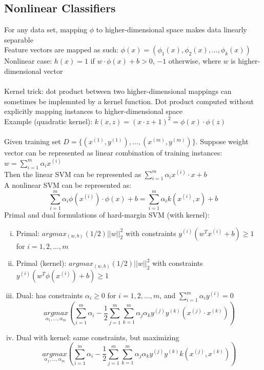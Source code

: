 \documentclass{article}
\begin{document}
		\subsection{Nonlinear Classifiers}
			For any data set, mapping $\phi$ to higher-dimensional space makes data linearly separable \\
			Feature vectors are mapped as such: $\phi(x) = (\phi_1(x), \phi_2(x), ..., \phi_k(x))$ \\
			Nonlinear case: $h(x) = 1$ if $w\cdot\phi(x) + b > 0$, $-1$ otherwise, where $w$ is higher-dimensional vector \\
			\\
			Kernel trick: dot product between two higher-dimensional mappings can sometimes be implemnted by a kernel function. Dot product computed without explicitly mapping instances to higher-dimensional space \\
			Example (quadratic kernel): $k(x, z) = (x \cdot z + 1)^2 = \phi(x)\cdot\phi(z)$ \\
			\\
			Given training set $D = \{(x^{(1)}, y^{(1)}), ..., (x^{(m)}, y^{(m)})\}$. Suppose weight vector can be represented as linear combination of training instances: $w = \sum_{i = 1}^m \alpha_ix^{(i)}$ \\
			Then the linear SVM can be represented as $\sum_{i = 1}^m \alpha_ix^{(i)} \cdot x + b$ \\
			A nonlinear SVM can be represented as:
			\begin{equation*}
				\sum\limits_{i = 1}^m \alpha_i\phi(x^{(i)})\cdot\phi(x) + b = \sum\limits_{i = 1}^m \alpha_i k(x^{(i)}, x) + b
				\end{equation*}
			Primal and dual formulations of hard-margin SVM (with kernel):
			\begin{enumerate}[(i)]
				\item Primal: $argmax_{(w, b)} (1/2)||w||_2^2$ with constraints $y^{(i)}(w^Tx^{(i)} + b) \geq 1$ for $i = 1, 2, ..., m$
				\item Primal (kernel): $argmax_{(w, b)} (1/2)||w||_2^2$ with constraints $y^{(i)}(w^T\phi(x^{(i)}) + b) \geq 1$
				\item Dual: has constraints $\alpha_i \geq 0$ for $i = 1, 2, ..., m$, and $\sum_{i = 1}^m \alpha_i y^{(i)} = 0$
				\begin{equation*}
					\underset{\alpha_1, ..., \alpha_m}{argmax} \left(\sum\limits_{i = 1}^m \alpha_i - \frac{1}{2}\sum\limits_{j = 1}^m\sum\limits_{k = 1}^m \alpha_j\alpha_ky^{(j)}y^{(k)}(x^{(j)} \cdot x^{(k)}) \right)
					\end{equation*}
				\item Dual with kernel: same constraints, but maximizing
				\begin{equation*}
					\underset{\alpha_1, ..., \alpha_m}{argmax} \left(\sum\limits_{i = 1}^m \alpha_i - \frac{1}{2}\sum\limits_{j = 1}^m\sum\limits_{k = 1}^m \alpha_j\alpha_ky^{(j)}y^{(k)}k(x^{(j)}, x^{(k)}) \right)
					\end{equation*}
				\end{enumerate}
\end{document}
